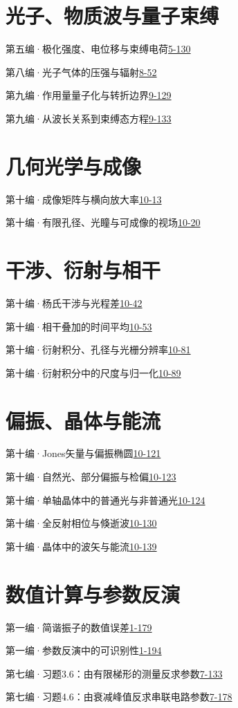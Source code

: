 \section*{光子、物质波与量子束缚}
\noindent 第五编·极化强度、电位移与束缚电荷\quad\href{course-page:5:132}{5-130}\par
\noindent 第八编·光子气体的压强与辐射\quad\href{course-page:8:55}{8-52}\par
\noindent 第九编·作用量量子化与转折边界\quad\href{course-page:9:133}{9-129}\par
\noindent 第九编·从波长关系到束缚态方程\quad\href{course-page:9:137}{9-133}\par
\section*{几何光学与成像}
\noindent 第十编·成像矩阵与横向放大率\quad\href{course-page:10:17}{10-13}\par
\noindent 第十编·有限孔径、光瞳与可成像的视场\quad\href{course-page:10:24}{10-20}\par
\section*{干涉、衍射与相干}
\noindent 第十编·杨氏干涉与光程差\quad\href{course-page:10:46}{10-42}\par
\noindent 第十编·相干叠加的时间平均\quad\href{course-page:10:57}{10-53}\par
\noindent 第十编·衍射积分、孔径与光栅分辨率\quad\href{course-page:10:85}{10-81}\par
\noindent 第十编·衍射积分中的尺度与归一化\quad\href{course-page:10:93}{10-89}\par
\section*{偏振、晶体与能流}
\noindent 第十编·Jones矢量与偏振椭圆\quad\href{course-page:10:125}{10-121}\par
\noindent 第十编·自然光、部分偏振与检偏\quad\href{course-page:10:127}{10-123}\par
\noindent 第十编·单轴晶体中的普通光与非普通光\quad\href{course-page:10:128}{10-124}\par
\noindent 第十编·全反射相位与倏逝波\quad\href{course-page:10:134}{10-130}\par
\noindent 第十编·晶体中的波矢与能流\quad\href{course-page:10:143}{10-139}\par
\section*{数值计算与参数反演}
\noindent 第一编·简谐振子的数值误差\quad\href{course-page:1:184}{1-179}\par
\noindent 第一编·参数反演中的可识别性\quad\href{course-page:1:199}{1-194}\par
\noindent 第七编·习题3.6：由有限梯形的测量反求参数\quad\href{course-page:7:136}{7-133}\par
\noindent 第七编·习题4.6：由衰减峰值反求串联电路参数\quad\href{course-page:7:181}{7-178}\par
